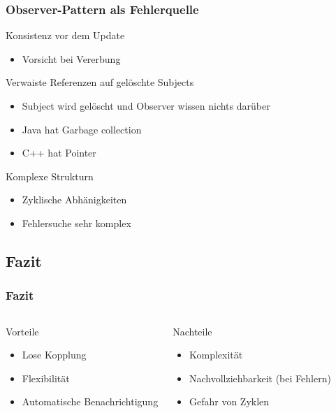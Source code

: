 \begin{frame}
\frametitle{Observer-Pattern als Fehlerquelle}
		\begin{block}{Konsistenz vor dem Update}
			\begin{itemize}
  				\item Vorsicht bei Vererbung
  			\end{itemize}  
  		\end{block}		
	\begin{block}{Verwaiste Referenzen auf gelöschte Subjects}
			\begin{itemize}
  				\item Subject wird gelöscht und Observer wissen nichts darüber
  				\item Java hat Garbage collection 
  				\item C++ hat Pointer 
  			\end{itemize}  
  		\end{block}	
  		\begin{block}{Komplexe Strukturn}
			\begin{itemize}
  				\item Zyklische Abhänigkeiten
  				\item Fehlersuche sehr komplex
  			\end{itemize}  
  		\end{block}	
		
\end{frame}


\subsection{Fazit}
\begin{frame}
	\frametitle{Fazit}
	\begin{columns} 
    		\begin{exampleblock}{Vorteile}
    			\begin{itemize}
    				\item Lose Kopplung
    				\item Flexibilität
    				\item Automatische Benachrichtigung
    			\end{itemize}
    		\end{exampleblock}
    		\begin{alertblock}{Nachteile}
    			\begin{itemize}
    				\item Komplexität
    				\item Nachvollziehbarkeit (bei Fehlern)
    				\item Gefahr von Zyklen
    			\end{itemize}
    		\end{alertblock}
  	\end{columns}   	  		
\end{frame}